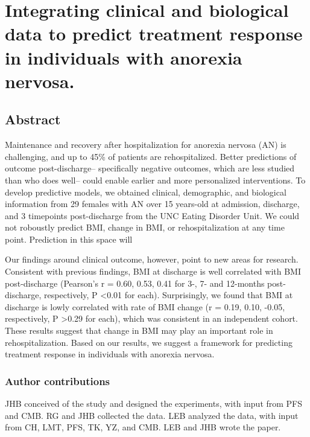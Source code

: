 \chapter{Integrating clinical and biological data to predict treatment response in individuals with anorexia nervosa.}\label{ch:singleCellSeq}

\section[Abstract]{Abstract\footnotemark}

Maintenance and recovery after hospitalization for anorexia nervosa (AN) is challenging, and up to 45\% of patients are rehospitalized. Better predictions of outcome post-discharge-- specifically negative outcomes, which are less studied than who does well-- could enable earlier and more personalized interventions. To develop predictive models, we obtained clinical, demographic, and biological information from 29 females with AN over 15 years-old at admission, discharge, and 3 timepoints post-discharge from the UNC Eating Disorder Unit. We could not roboustly predict BMI, change in BMI, or rehospitalization at any time point. Prediction in this space will

Our findings around clinical outcome, however, point to new areas for research. Consistent with previous findings, BMI at discharge is well correlated with BMI post-discharge (Pearson's r = 0.60, 0.53, 0.41 for 3-, 7- and 12-months post-discharge, respectively, P \textless 0.01 for each). Surprisingly, we found that BMI at discharge is lowly correlated with rate of BMI change (r = 0.19, 0.10, -0.05, respectively, P \textgreater 0.29 for each), which was consistent in an independent cohort. These results suggest that change in BMI may play an important role in rehospitalization. Based on our results, we suggest a framework for predicting treatment response in individuals with anorexia nervosa.




\subsection{Author contributions}

JHB conceived of the study and designed the experiments, with input from PFS and CMB. RG and JHB collected the data. LEB analyzed the data, with input from CH, LMT, PFS, TK, YZ, and CMB. LEB and JHB wrote the paper. 

